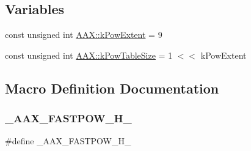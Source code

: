 \subsection*{Variables}
\begin{DoxyCompactItemize}
\item 
const unsigned int \mbox{\hyperlink{a00852_a4e6fcac015bb083018e8897563966cf6}{A\+A\+X\+::k\+Pow\+Extent}} = 9
\item 
const unsigned int \mbox{\hyperlink{a00852_a59f1ab59ea51ed94f87e8d935870df9e}{A\+A\+X\+::k\+Pow\+Table\+Size}} = 1 $<$$<$ k\+Pow\+Extent
\end{DoxyCompactItemize}


\subsection{Macro Definition Documentation}
\mbox{\label{a00764_ac6d8a45526d6683f24769be9e942fc4e}} 
\subsubsection{\texorpdfstring{\_AAX\_FASTPOW\_H\_}{\_AAX\_FASTPOW\_H\_}}
{\footnotesize\ttfamily \#define \+\_\+\+A\+A\+X\+\_\+\+F\+A\+S\+T\+P\+O\+W\+\_\+\+H\+\_\+}

